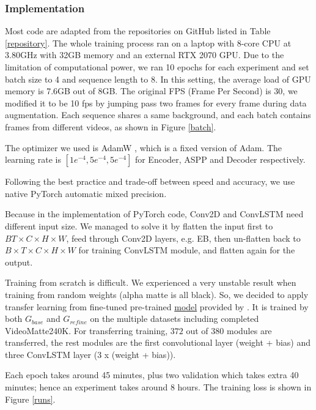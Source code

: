 \documentclass[final]{cvpr}
\begin{document}
\subsubsection{Implementation}

Most code are adapted from the repositories on GitHub listed in Table \ref{repository}.
The whole training process ran on a laptop with 8-core CPU at 3.80GHz with 32GB memory and an external RTX 2070 GPU.
Due to the limitation of computational power, we ran 10 epochs for each experiment and set batch size to 4 and sequence length to 8.
In this setting, the average load of GPU memory is 7.6GB out of 8GB.
The original FPS (Frame Per Second) is 30, we modified it to be 10 fps by jumping pass two frames for every frame during data augmentation.
Each sequence shares a same background, and each batch contains frames from different videos, as shown in Figure \ref{batch}.

The optimizer we used is AdamW \cite{Loshchilov2017FixingWD}, which is a fixed version of Adam.
The learning rate is $[1e^{-4},5e^{-4},5e^{-4}]$ for Encoder, ASPP and Decoder respectively.

Following the best practice and trade-off between speed and accuracy, we use native PyTorch automatic mixed precision.

Because in the implementation of PyTorch code, Conv2D and ConvLSTM need different input size.
We managed to solve it by flatten the input first to $BT\times C\times H \times W$, feed through Conv2D layers, e.g. EB, then un-flatten back to $B\times T\times C\times H \times W$ for training ConvLSTM module, and flatten again for the output.

Training from scratch is difficult.
We experienced a very unstable result when training from random weights (alpha matte is all black).
So, we decided to apply transfer learning from fine-tuned pre-trained \href{https://drive.google.com/drive/folders/1cbetlrKREitIgjnIikG1HdM4x72FtgBh}{model} provided by \cite{linRealTimeHighResolutionBackground2020a}.
It is trained by both $G_{base}$ and $G_{refine}$ on the multiple datasets including completed VideoMatte240K.
For transferring training, $372$ out of $380$ modules are transferred, the rest modules are the first convolutional layer (weight + bias) and three ConvLSTM layer (3 x (weight + bias)).

Each epoch takes around 45 minutes, plus two validation which takes extra 40 minutes; hence an experiment takes around 8 hours.
The training loss is shown in Figure \ref{runs}.
\end{document}
